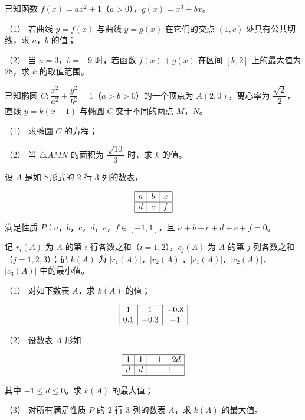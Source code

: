 \begin{question}
已知函数 $f(x)=ax^2+1$（$a>0$），$g(x)=x^3+bx$。

（1） 若曲线 $y=f(x)$ 与曲线 $y=g(x)$ 在它们的交点 $(1,c)$ 处具有公共切线，求 $a$，$b$ 的值；

（2） 当 $a=3$，$b=-9$ 时，若函数 $f(x)+g(x)$ 在区间 $[k,2]$ 上的最大值为 $28$，求 $k$ 的取值范围。

\end{question}
\begin{question}
已知椭圆 $C:\dfrac{x^2}{a^2}+\dfrac{y^2}{b^2}=1$（$a>b>0$）的一个顶点为 $A(2,0)$，离心率为 $\dfrac{\sqrt2}2$，直线 $y=k(x-1)$ 与椭圆 $C$ 交于不同的两点 $M$，$N$。

（1） 求椭圆 $C$ 的方程；

（2） 当 $\triangle AMN$ 的面积为 $\dfrac{\sqrt{10}}3$ 时，求 $k$ 的值。

\end{question}
\begin{question}
设 $A$ 是如下形式的 $2$ 行 $3$ 列的数表，

\nopagebreak[4]
\[\begin{array}{|c|c|c|}\hline a & b & c\\ \hline d & e & f\\ \hline\end{array}\]

满足性质 $P$：$a$，$b$，$c$，$d$，$e$，$f\in[-1,1]$，且 $a+b+c+d+e+f=0$。

记 $r_i(A)$ 为 $A$ 的第 $i$ 行各数之和（$i=1,2$），$c_j(A)$ 为 $A$ 的第 $j$ 列各数之和（$j=1,2,3$）；记 $k(A)$ 为 $|r_1(A)|$，$|r_2(A)|$，$|c_1(A)|$，$|c_2(A)|$，$|c_3(A)|$ 中的最小值。

（1） 对如下数表 $A$，求 $k(A)$ 的值；

\nopagebreak[4]
\[\begin{array}{|c|c|c|}\hline 1 & 1 & -0.8\\ \hline 0.1 & -0.3 & -1\\ \hline\end{array}\]

（2） 设数表 $A$ 形如

\nopagebreak[4]
\[\begin{array}{|c|c|c|}\hline 1 & 1 & -1-2d\\ \hline d & d & -1\\ \hline\end{array}\]

其中 $-1\leqslant d\leqslant0$。求 $k(A)$ 的最大值；

（3） 对所有满足性质 $P$ 的 $2$ 行 $3$ 列的数表 $A$，求 $k(A)$ 的最大值。

\clearpage

\end{question}